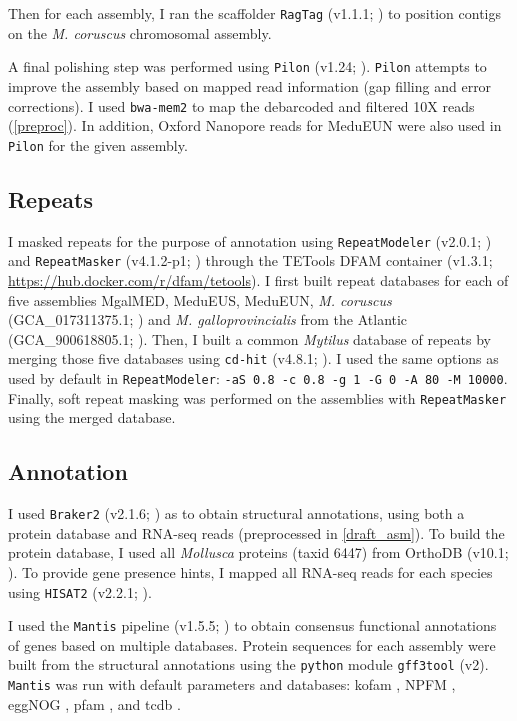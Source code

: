 \documentclass[11pt, a4paper]{article}
\begin{document}
Then for each assembly, I ran the scaffolder \texttt{RagTag} (v1.1.1; \cite{Alonge2021}) to position contigs on the \emph{M. coruscus} chromosomal assembly.

A final polishing step was performed using \texttt{Pilon} (v1.24; \cite{Walker2014}).
\texttt{Pilon} attempts to improve the assembly based on mapped read information (gap filling and error corrections).
I used \texttt{bwa-mem2} to map the debarcoded and filtered 10X reads (\cref{preproc}).
In addition, Oxford Nanopore reads for MeduEUN were also used in \texttt{Pilon} for the given assembly.

\subsection{Repeats}

I masked repeats for the purpose of annotation using \texttt{RepeatModeler} (v2.0.1; \cite{Flynn2020}) and \texttt{RepeatMasker} (v4.1.2-p1; \cite{Smit2013}) through the TETools DFAM container (v1.3.1; \url{https://hub.docker.com/r/dfam/tetools}).
I first built repeat databases for each of five assemblies MgalMED, MeduEUS, MeduEUN, \textit{M. coruscus} (GCA\_017311375.1; \cite{Yang2021}) and \textit{M. galloprovincialis} from the Atlantic (GCA\_900618805.1; \cite{Gerdol2020}).
Then, I built a common \textit{Mytilus} database of repeats by merging those five databases using \texttt{cd-hit} (v4.8.1; \cite{Fu2012}). I used the same options as used by default in \texttt{RepeatModeler}: \texttt{-aS 0.8 -c 0.8 -g 1 -G 0 -A 80 -M 10000}.
Finally, soft repeat masking was performed on the assemblies with \texttt{RepeatMasker} using the merged database.

\subsection{Annotation}

I used \texttt{Braker2} (v2.1.6; \cite{Bruna2021}) as to obtain structural annotations, using both a protein database and RNA-seq reads (preprocessed in \cref{draft_asm}).
To build the protein database, I used all \textit{Mollusca} proteins (taxid 6447) from OrthoDB (v10.1; \cite{Kriventseva2019}).
To provide gene presence hints, I mapped all RNA-seq reads for each species using \texttt{HISAT2} (v2.2.1; \cite{Kim2019}).

I used the \texttt{Mantis} pipeline (v1.5.5; \cite{Queiros2021}) to obtain consensus functional annotations of genes based on multiple databases.
Protein sequences for each assembly were built from the structural annotations using the \texttt{python} module \texttt{gff3tool} (v2).
\texttt{Mantis} was run with default parameters and databases:
kofam \parencite{Aramaki2020}, NPFM \parencite{Lu2020}, eggNOG \parencite{Huerta-Cepas2019}, pfam \parencite{El-Gebali2019}, and tcdb \parencite{Saier2021}.
\end{document}
